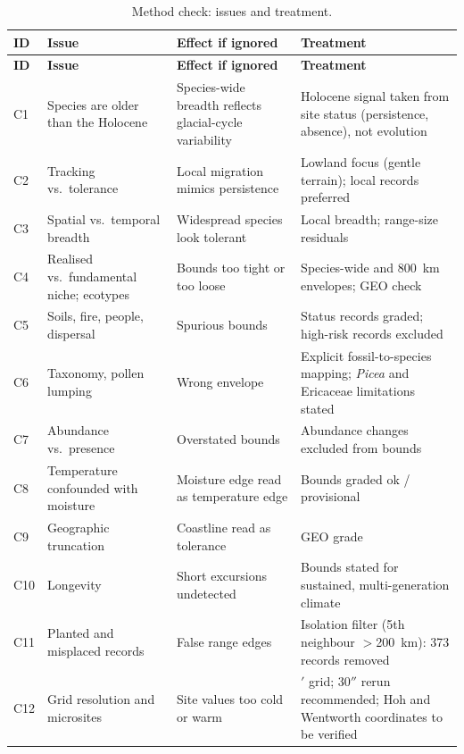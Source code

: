 \documentclass[11pt]{article}
\begin{document}
{\small
\begin{longtable}{>{\raggedright\arraybackslash}p{}>{\raggedright\arraybackslash}p{}>{\raggedright\arraybackslash}p{}>{\raggedright\arraybackslash}p{}}
\caption{Method check: issues and treatment.}\label{tab:check}\\
\toprule
\textbf{ID} & \textbf{Issue} & \textbf{Effect if ignored} & \textbf{Treatment} \\
\midrule
\endfirsthead
\toprule
\textbf{ID} & \textbf{Issue} & \textbf{Effect if ignored} & \textbf{Treatment} \\
\midrule
\endhead
\bottomrule
\endfoot
C1 & Species are older than the Holocene & Species-wide breadth reflects glacial-cycle variability & Holocene signal taken from site status (persistence, absence), not evolution \citep{smithbeaulieu2009,ackerly2003} \\
C2 & Tracking vs.\ tolerance & Local migration mimics persistence & Lowland focus (gentle terrain); local records preferred \citep{davisshaw2001,rull2009} \\
C3 & Spatial vs.\ temporal breadth & Widespread species look tolerant & Local breadth; range-size residuals \citep{slatyer2013} \\
C4 & Realised vs.\ fundamental niche; ecotypes & Bounds too tight or too loose & Species-wide and 800~km envelopes; GEO check \citep{sax2013,rehfeldt1999} \\
C5 & Soils, fire, people, dispersal & Spurious bounds & Status records graded; high-risk records excluded \\
C6 & Taxonomy, pollen lumping & Wrong envelope & Explicit fossil-to-species mapping; \emph{Picea} and Ericaceae limitations stated \\
C7 & Abundance vs.\ presence & Overstated bounds & Abundance changes excluded from bounds \\
C8 & Temperature confounded with moisture & Moisture edge read as temperature edge & Bounds graded ok / provisional \\
C9 & Geographic truncation & Coastline read as tolerance & GEO grade \\
C10 & Longevity & Short excursions undetected & Bounds stated for sustained, multi-generation climate \\
C11 & Planted and misplaced records & False range edges & Isolation filter (5th neighbour $>$200~km): 373 records removed \\
C12 & Grid resolution and microsites & Site values too cold or warm & 2.5$'$ grid; 30$''$ rerun recommended; Hoh and Wentworth coordinates to be verified \\
\end{longtable}
}
\end{document}
